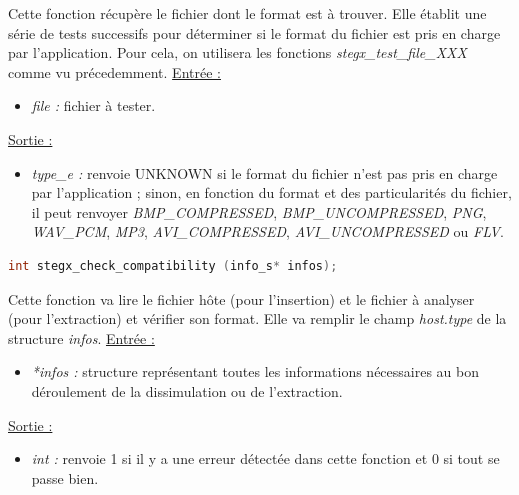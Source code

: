 \documentclass[11pt]{article}
\begin{document}
Cette fonction récupère le fichier dont le format est à trouver. Elle établit une 
série de tests successifs pour déterminer si le format du fichier est pris en charge 
par l'application. 
Pour cela, on utilisera les fonctions \textit{stegx\_test\_file\_XXX} 
comme vu précedemment. 
\newline
\underline{Entrée :} 
\begin{itemize}
\item \textit{file :} fichier à tester. 
\end{itemize}
\underline{Sortie :} 
\begin{itemize}
\item \textit{type\_e :} renvoie UNKNOWN si le format du fichier n'est pas pris en 
charge par l'application ; sinon, en fonction du format et des particularités 
du fichier, il peut renvoyer \textit{BMP\_COMPRESSED}, \textit{BMP\_UNCOMPRESSED}, 
\textit{PNG}, \textit{WAV\_PCM}, \textit{MP3}, \textit{AVI\_COMPRESSED}, 
\textit{AVI\_UNCOMPRESSED} ou \textit{FLV}. 
\newline 
\end{itemize}

\begin{lstlisting}[language=c]
int stegx_check_compatibility (info_s* infos);
\end{lstlisting}

Cette fonction va lire le fichier hôte (pour l'insertion) et le fichier 
à analyser (pour l'extraction) et vérifier son format. 
Elle va remplir le champ \textit{host.type} de la structure \textit{infos}.  
\newline
\underline{Entrée :}
\begin{itemize}
\item \textit{*infos :} structure représentant toutes les informations 
nécessaires au bon déroulement de la dissimulation ou de l'extraction. 
\end{itemize}
\underline{Sortie :}
\begin{itemize}
\item \textit{int :} renvoie 1 si il y a une erreur détectée dans cette 
fonction et 0 si tout se passe bien.
\newline 
\end{itemize}

\end{document}
